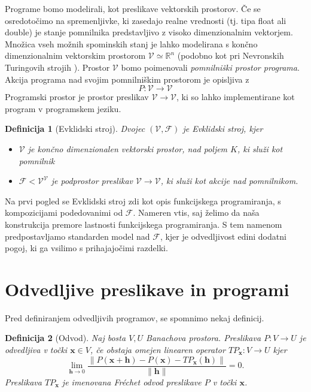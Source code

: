 \documentclass[a4paper, 12pt]{book}
\newcommand{\RR}{\mathbb{R}}
\newcommand{\VV}{\mathcal{V}}
\newcommand{\x}{\mathbf{x}}
\newcommand{\h}{\mathbf{h}}
\newcommand{\F}{\mathcal{F}}
\newtheorem{definicija}{Definicija}[chapter]
\begin{document}
Programe bomo modelirali, kot preslikave vektorskih prostorov. Če se osredotočimo na spremenljivke, ki zasedajo realne vrednosti (tj. tipa float ali double) je stanje pomnilnika predstavljivo z visoko dimenzionalnim vektorjem. Množica vseh možnih spominskih stanj je lahko modelirana s končno dimenzionalnim vektorskim prostorom $\VV\simeq\RR^n$ (podobno kot pri Nevronskih Turingovih strojih \cite{neuTur}). Prostor $\VV$ bomo poimenovali \emph{pomnilniški prostor programa}. Akcija programa nad svojim pomnilniškim prostorom je opisljiva z
\begin{equation}
P:\VV\to\VV
\end{equation}
Programski prostor je prostor preslikav $\VV\to\VV$, ki so lahko implementirane kot program v programskem jeziku.
\begin{definicija}[Evklidski stroj]
Dvojec $(\VV,\F)$ je Evklidski stroj, kjer
\begin{itemize}
\item
$\VV$ je končno dimenzionalen vektorski prostor, nad poljem $K$, ki služi kot pomnilnik
\item
$\F<\VV^\VV$ je podprostor preslikav $\VV\to\VV$, ki služi kot akcije nad pomnilnikom.
\end{itemize}
\end{definicija}

Na prvi pogled se Evklidski stroj zdi kot opis funkcijskega programiranja, s kompozicijami podedovanimi od $\F$. Nameren vtis, saj želimo da naša konstrukcija premore lastnosti funkcijskega programiranja. S tem namenom predpostavljamo standarden model nad $\F$, kjer je odvedljivost edini dodatni pogoj, ki ga vsilimo s prihajajočimi razdelki.

\section{Odvedljive preslikave in programi}

Pred definiranjem odvedljivih programov, se spomnimo nekaj definicij.
\begin{definicija}[Odvod]
Naj bosta $V,U$ Banachova prostora. Preslikava $P:V\to U$ je odvedljiva v točki
  $\x\in V$, če obstaja omejen linearen operator $TP_\x:V\to U$ kjer
  \begin{equation}
    \label{eq:frechet}
    \lim_{\h\to 0}\frac{\|P(\x+\h)-P(\x)-TP_\x(\h)\|}{\|\h\|} = 0.
  \end{equation}
  Preslikava $TP_\x$ je imenovana \emph{Fréchet odvod} preslikave $P$ v točki $\x$.
\end{definicija}
\end{document}
